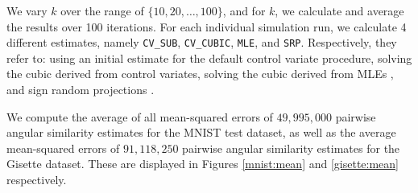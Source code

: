 \documentclass[runningheads]{llncs}
\begin{document}
    We vary $k$ over the range of $\{10, 20, \dots, 100\}$, and for $k$, we calculate and average the results over 100 iterations. For each individual simulation run, we calculate 4 different estimates, namely \verb|CV_SUB|, \verb|CV_CUBIC|, \verb|MLE|, and \verb|SRP|. Respectively, they refer to: using an initial estimate for the default control variate procedure, solving the cubic derived from control variates, solving the cubic derived from MLEs \cite{kang2018improving}, and sign random projections \cite{goemans1995improved}.
    
    We compute the average of all mean-squared errors of $49,995,000$ pairwise angular similarity estimates for the MNIST test dataset, as well as the average mean-squared errors of $91,118,250$ pairwise angular similarity estimates for the Gisette dataset. These are displayed in Figures \ref{mnist:mean} and \ref{gisette:mean} respectively. %
\end{document}

